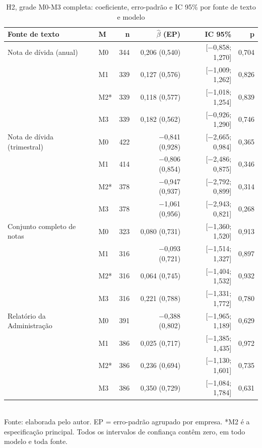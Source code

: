 \documentclass[a4paper,12pt]{report}
\begin{document}
\begin{table}[htbp]
    \centering
    \caption{H2, grade M0-M3 completa: coeficiente, erro-padrão e IC 95\% por fonte de texto e modelo}
    \label{tab:h2_detalhe}
    \small
    \begin{tabular}{@{}llrrrr@{}}
        \toprule
        \textbf{Fonte de texto} & \textbf{M} & \textbf{n} & \textbf{$\hat\beta$ (EP)} & \textbf{IC 95\%} & \textbf{p} \\
        \midrule
        Nota de dívida (anual)      & M0 & 344 & 0,206 (0,540) & [$-$0,858; 1,270] & 0,704 \\
                                     & M1 & 339 & 0,127 (0,576) & [$-$1,009; 1,262] & 0,826 \\
                                     & M2* & 339 & 0,118 (0,577) & [$-$1,018; 1,254] & 0,839 \\
                                     & M3 & 339 & 0,182 (0,562) & [$-$0,926; 1,290] & 0,746 \\
        Nota de dívida (trimestral) & M0 & 422 & $-$0,841 (0,928) & [$-$2,665; 0,984] & 0,365 \\
                                     & M1 & 414 & $-$0,806 (0,854) & [$-$2,486; 0,875] & 0,346 \\
                                     & M2* & 378 & $-$0,947 (0,937) & [$-$2,792; 0,899] & 0,314 \\
                                     & M3 & 378 & $-$1,061 (0,956) & [$-$2,943; 0,821] & 0,268 \\
        Conjunto completo de notas  & M0 & 323 & 0,080 (0,731) & [$-$1,360; 1,520] & 0,913 \\
                                     & M1 & 316 & $-$0,093 (0,721) & [$-$1,514; 1,327] & 0,897 \\
                                     & M2* & 316 & 0,064 (0,745) & [$-$1,404; 1,532] & 0,932 \\
                                     & M3 & 316 & 0,221 (0,788) & [$-$1,331; 1,772] & 0,780 \\
        Relatório da Administração  & M0 & 391 & $-$0,388 (0,802) & [$-$1,965; 1,189] & 0,629 \\
                                     & M1 & 386 & 0,025 (0,717) & [$-$1,385; 1,435] & 0,972 \\
                                     & M2* & 386 & 0,236 (0,694) & [$-$1,130; 1,601] & 0,735 \\
                                     & M3 & 386 & 0,350 (0,729) & [$-$1,084; 1,784] & 0,631 \\
        \bottomrule
    \end{tabular}
    \\[0.3cm]
    {\footnotesize Fonte: elaborada pelo autor. EP = erro-padrão agrupado por empresa. *M2 é a especificação principal. Todos os intervalos de confiança contêm zero, em todo modelo e toda fonte.}
\end{table}
\end{document}
